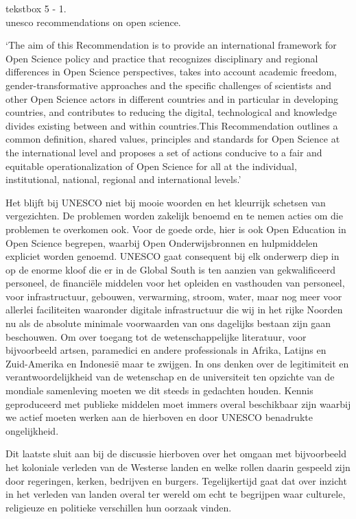 \documentclass[empirical, authordate, ]{new-jote-article}
\begin{document}
	\begin{bookbox}{\raggedright tekstbox 5 - 1. \\unesco recommendations on open science.}
		‘The aim of this Recommendation is to provide an international framework for Open Science policy and practice that recognizes disciplinary and regional differences in Open Science perspectives, takes into account academic freedom, gender-transformative approaches and the specific challenges of scientists and other Open Science actors in different countries and in particular in developing countries, and contributes to reducing the digital, technological and knowledge divides existing between and within countries.This Recommendation outlines a common definition, shared values, principles and standards for Open Science at the international level and proposes a set of actions conducive to a fair and equitable operationalization of Open Science for all at the individual, institutional, national, regional and international levels.'
	\end{bookbox}

	Het blijft bij UNESCO niet bij mooie woorden en het kleurrijk schetsen van vergezichten. De problemen worden zakelijk benoemd en te nemen acties om die problemen te overkomen ook. Voor de goede orde, hier is ook Open Education in Open Science begrepen, waarbij Open Onderwijsbronnen en hulpmiddelen expliciet worden genoemd. UNESCO gaat consequent bij elk onderwerp diep in op de enorme kloof die er in de Global South is ten aanzien van gekwalificeerd personeel, de financiële middelen voor het opleiden en vasthouden van personeel, voor infrastructuur, gebouwen, verwarming, stroom, water, maar nog meer voor allerlei faciliteiten waaronder digitale infrastructuur die wij in het rijke Noorden nu als de absolute minimale voorwaarden van ons dagelijks bestaan zijn gaan beschouwen. Om over toegang tot de wetenschappelijke literatuur, voor bijvoorbeeld artsen, paramedici en andere professionals in Afrika, Latijns en Zuid-Amerika en Indonesië maar te zwijgen. In ons denken over de legitimiteit en verantwoordelijkheid van de wetenschap en de universiteit ten opzichte van de mondiale samenleving moeten we dit steeds in gedachten houden. Kennis geproduceerd met publieke middelen moet immers overal beschikbaar zijn waarbij we actief moeten werken aan de hierboven en door UNESCO benadrukte ongelijkheid.



	Dit laatste sluit aan bij de discussie hierboven over het omgaan met bijvoorbeeld het koloniale verleden van de Westerse landen en welke rollen daarin gespeeld zijn door regeringen, kerken, bedrijven en burgers. Tegelijkertijd gaat dat over inzicht in het verleden van landen overal ter wereld om echt te begrijpen waar culturele, religieuze en politieke verschillen hun oorzaak vinden.
\end{document}
